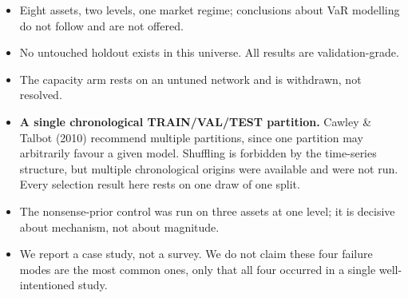\begin{itemize}
\tightlist
\item
  Eight assets, two levels, one market regime; conclusions about VaR modelling do not follow
  and are not offered.
\item
  No untouched holdout exists in this universe. All results are validation-grade.
\item
  The capacity arm rests on an untuned network and is withdrawn, not resolved.
\item
  \textbf{A single chronological TRAIN/VAL/TEST partition.} Cawley \& Talbot (2010) recommend multiple
  partitions, since one partition may arbitrarily favour a given model. Shuffling is forbidden
  by the time-series structure, but multiple chronological origins were available and were not
  run. Every selection result here rests on one draw of one split.
\item
  The nonsense-prior control was run on three assets at one level; it is decisive about
  mechanism, not about magnitude.
\item
  We report a case study, not a survey. We do not claim these four failure modes are the most
  common ones, only that all four occurred in a single well-intentioned study.
\end{itemize}
